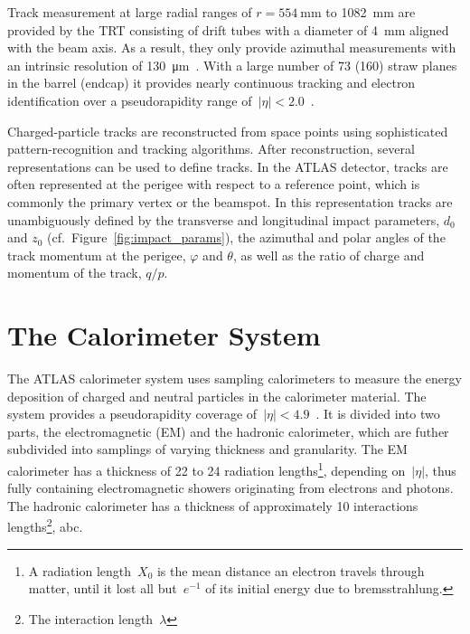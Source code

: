 Track measurement at large radial ranges of $r = \SI{554}{\milli\metre}$ to
\SI{1082}{\milli\metre} are provided by the TRT consisting of drift tubes with a
diameter of \SI{4}{\milli\metre} aligned with the beam axis. As a result, they
only provide azimuthal measurements with an intrinsic resolution of
\SI{130}{\micro\metre}~\cite{atlas_detector}. With a large number of 73 (160)
straw planes in the barrel (endcap) it provides nearly continuous tracking and
electron identification over a pseudorapidity range
of~$|\eta| < 2.0$~\cite{atlas_detector}.

Charged-particle tracks are reconstructed from space points using sophisticated
pattern-recognition and tracking algorithms. After reconstruction, several
representations can be used to define tracks. In the ATLAS detector, tracks are
often represented at the perigee with respect to a reference point, which is
commonly the primary vertex or the beamspot. In this representation tracks are
unambiguously defined by the transverse and longitudinal impact parameters,
$d_0$ and $z_0$ (cf.\ Figure~\ref{fig:impact_params}), the azimuthal and polar
angles of the track momentum at the perigee, $\varphi$ and $\theta$, as well as
the ratio of charge and momentum of the track, $q / p$.


\section{The Calorimeter System}
\label{sec:atlas_calo}

The ATLAS calorimeter system uses sampling calorimeters to measure the energy
deposition of charged and neutral particles in the calorimeter material. The
system provides a pseudorapidity coverage
of~$|\eta| < 4.9$~\cite{atlas_detector}. It is divided into two parts, the
electromagnetic (EM) and the hadronic calorimeter, which are futher subdivided
into samplings of varying thickness and granularity. The EM calorimeter has a
thickness of 22 to 24 radiation lengths\footnote{A radiation length~$X_0$ is the
  mean distance an electron travels through matter, until it lost all
  but~$e^{-1}$ of its initial energy due to bremsstrahlung.}, depending
on~$|\eta|$, thus fully containing electromagnetic showers originating from
electrons and photons. The hadronic calorimeter has a thickness of approximately
10 interactions lengths\footnote{The interaction length~$\lambda$}, abc.








